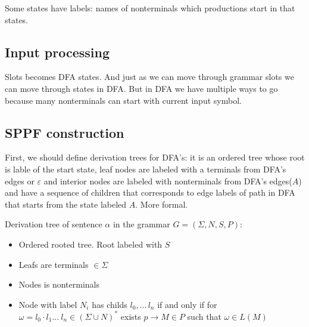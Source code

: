 \documentclass[runningheads,a4paper]{llncs}
\begin{document}
Some states have labels: names of nonterminals which productions start in that states.


\subsection{Input processing}%

Slots becomes DFA states. And just as we can move through grammar slots we can move through states 
in DFA. But in DFA we have multiple ways to go because many nonterminals can start with current input symbol. 








\subsection{SPPF construction}

First, we should define derivation trees for DFA's: it is an ordered tree whose root is lable of the start state,
leaf nodes are labeled with a terminals from DFA's edges or $\varepsilon$ and interior nodes are labeled with 
nonterminals from DFA's edges($ A $) and have a sequence of children that corresponds to edge labels of path in 
DFA that starts from the state labeled $ A $. More formal. 

\begin{mydef}

Derivation tree of sentence $\alpha$ in the grammar $G=(\Sigma, N, S, P)$:

\begin{itemize}
\item Ordered rooted tree. Root labeled with $S$
\item Leafs are terminals $\in \Sigma$
\item Nodes is nonterminals
\item Node with label $N_i$ has childs $l_0, \dots\, l_n$ if and only if for $\omega = l_0 \cdot l_1 \dots\ l_n\in (\Sigma \cup N)^*$ exists $p \rightarrow M \in P$ such that $\omega \in L(M)$
\end{itemize}

\end{mydef}
\end{document}
